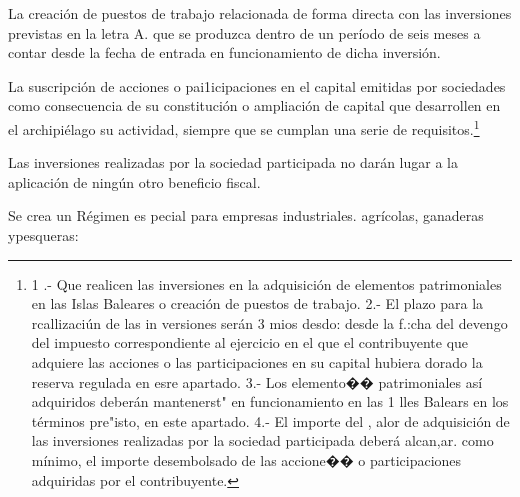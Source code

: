 \documentclass[10pt,a4paper]{article}
\begin{document}
La creación de puestos de trabajo relacionada de forma directa con las inversiones previstas en la letra A. que se produzca dentro de un período de seis meses a contar desde la fecha de entrada en funcionamiento de dicha inversión.

La suscripción de acciones o pai1icipaciones en el capital emitidas por sociedades como consecuencia de su constitución o ampliación de capital que desarrollen en el archipiélago su actividad, siempre que se cumplan una serie de requisitos.\footnote{
1 .- Que realicen las inversiones en la adquisición de elementos patrimoniales en las Islas Baleares o creación de puestos de trabajo.
2.- El plazo para la rcallizaciún de las in versiones serán 3 mios desdo: desde la f.:cha del devengo del impuesto correspondiente al ejercicio en el que el contribuyente que adquiere las acciones o las participaciones en su capital hubiera dorado la reserva regulada en esre apartado.
3.- Los elemento�� patrimoniales así adquiridos deberán mantenerst" en funcionamiento en las 1 lles Balears en los términos pre"isto, en este apartado.
4.- El importe del , alor de adquisición de las inversiones realizadas por la sociedad participada deberá alcan,ar. como mínimo, el importe desembolsado de las accione�� o participaciones adquiridas por el contribuyente.
}

Las inversiones realizadas por la sociedad participada no darán lugar a la aplicación de ningún otro beneficio fiscal.

Se crea un Régimen es pecial para empresas industriales. agrícolas, ganaderas ypesqueras:
\end{document}
